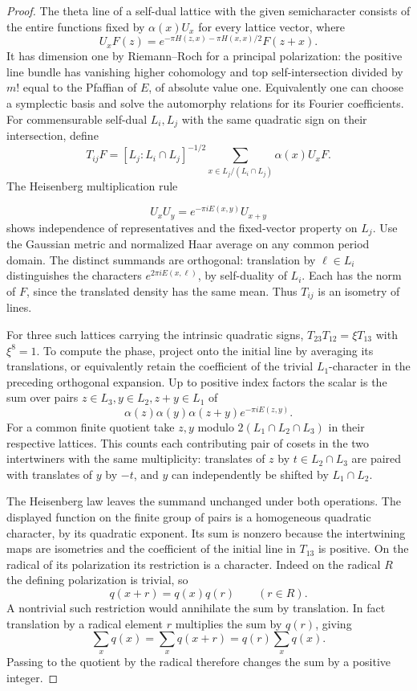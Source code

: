 \begin{proof}
The theta line of a self-dual lattice with the given
semicharacter consists of the entire functions fixed by
\(\alpha(x)U_x\) for every lattice vector, where
\[
 U_xF(z)=e^{-\pi H(z,x)-\pi H(x,x)/2}F(z+x).
\]
It has dimension one by Riemann--Roch for a principal
polarization: the positive line bundle has vanishing higher
cohomology and top self-intersection divided by \(m!\) equal
to the Pfaffian of \(E\), of absolute value one. Equivalently
one can choose a symplectic basis and solve the automorphy
relations for its Fourier coefficients. For commensurable
self-dual \(L_i,L_j\) with the same quadratic sign on their
intersection, define
\[
 T_{ij}F=[L_j:L_i\cap L_j]^{-1/2}
       \sum_{x\in L_j/(L_i\cap L_j)}\alpha(x)U_xF .
\]
The Heisenberg multiplication rule

\[
  U_x U_y=e^{-\pi i E(x,y)}U_{x+y}
\]
 shows independence of
representatives and the fixed-vector property on \(L_j\).
Use the Gaussian metric and normalized Haar average on any
common period domain. The distinct summands are orthogonal:
translation by \(\ell\in L_i\) distinguishes the characters
\(e^{2\pi i E(x,\ell)}\), by self-duality of \(L_i\).
Each has the norm of \(F\), since the translated density has
the same mean. Thus \(T_{ij}\) is an isometry of lines.

For three such lattices carrying the intrinsic quadratic signs,
\(T_{23}T_{12}=\xi T_{13}\) with \(\xi^8=1\). To compute the
phase, project onto the initial line by averaging its
translations, or equivalently retain the coefficient of the
trivial \(L_1\)-character in the preceding orthogonal expansion.
Up to positive index factors the scalar is the sum over pairs
\(z\in L_3,y\in L_2,z+y\in L_1\) of
\[
 \alpha(z)\alpha(y)\alpha(z+y)e^{-\pi i E(z,y)} .
\]
For a common finite quotient take \(z,y\) modulo
\(2(L_1\cap L_2\cap L_3)\) in their respective lattices.
This counts each contributing pair of cosets in the two
intertwiners with the same multiplicity: translates of
\(z\) by \(t\in L_2\cap L_3\) are paired with translates of
\(y\) by \(-t\), and \(y\) can independently be shifted by
\(L_1\cap L_2\).

The Heisenberg law leaves the summand
unchanged under both operations. The displayed function
on the finite group of pairs is a homogeneous quadratic
character, by its quadratic exponent. Its sum is nonzero
because the intertwining maps are isometries and the
coefficient of the initial line in \(T_{13}\) is positive.
On the radical of its polarization its restriction is a
character.
Indeed on the radical \(R\) the defining polarization is trivial, so
\[
  q(x+r)=q(x)q(r)\qquad(r\in R).
\]
 A nontrivial such restriction would annihilate
the sum by translation.
In fact translation by a radical element \(r\) multiplies the sum by \(q(r)\), giving
\[
  \sum_xq(x)=\sum_x q(x+r)=q(r)\sum_xq(x).
\]
 Passing to the quotient by the
radical therefore changes the sum by a positive integer.


\end{proof}
